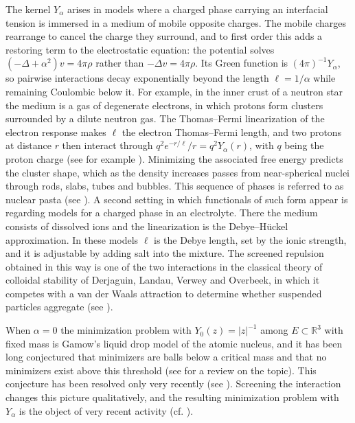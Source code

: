\documentclass[a4paper,11pt,reqno]{amsart}
\numberwithin{equation}{section}
\theoremstyle{remark}
\theoremstyle{definition}
\begin{document}
The kernel $Y_\alpha$ arises in models where a charged phase carrying an interfacial tension is immersed in a medium of mobile opposite charges. The mobile charges rearrange to cancel the charge they surround, and to first order this adds a restoring term to the electrostatic equation: the potential solves $(-\Delta+\alpha^{2})v=4\pi\rho$ rather than $-\Delta v=4\pi\rho$. Its Green function is $(4\pi)^{-1}Y_\alpha$, so pairwise interactions decay exponentially beyond the length $\ell=1/\alpha$ while remaining Coulombic below it. For example, in the inner crust of a neutron star the medium is a gas of degenerate electrons, in which protons form clusters surrounded by a dilute neutron gas. The Thomas--Fermi linearization of the electron response makes $\ell$ the electron Thomas--Fermi length, and two protons at distance $r$ then interact through $q^{2}e^{-r/\ell}/r=q^{2}Y_\alpha(r)$, with $q$ being the proton charge
(see for example \cite{CaplanHorowitz,ChugunovHorowitz}). Minimizing the associated free energy predicts the cluster shape, which as the density increases passes from near-spherical nuclei through rods, slabs, tubes and bubbles. This sequence of phases is referred to as nuclear pasta (see \cite{RPW,HSY,PR}). A second setting in which functionals of such form appear is regarding models for a charged phase in an electrolyte. There the medium consists of dissolved ions and the linearization is the Debye--H\"uckel approximation. In these models $\ell$ is the Debye length, set by the ionic strength, and it is adjustable by adding salt into the mixture. The screened repulsion obtained in this way is one of the two interactions in the classical theory of colloidal stability of Derjaguin, Landau, Verwey and Overbeek, in which it competes with a van der Waals attraction to determine whether suspended particles aggregate (see \cite{Isr,VO}).

When $\alpha=0$ the minimization problem with $Y_0(z)=|z|^{-1}$ among $E\subset \mathbb{R}^3$ with fixed mass is Gamow's liquid drop model of the atomic nucleus, and it has been long conjectured that minimizers are balls below a critical mass and that no minimizers exist above this threshold (see \cite{CMT} for a review on the topic). This conjecture has been resolved only very recently (see \cite{CG}). Screening the interaction changes this picture qualitatively, and the resulting minimization problem with $Y_{\alpha}$ is the object of very recent activity (cf. \cite{BMP,MNS}). 
\end{document}
